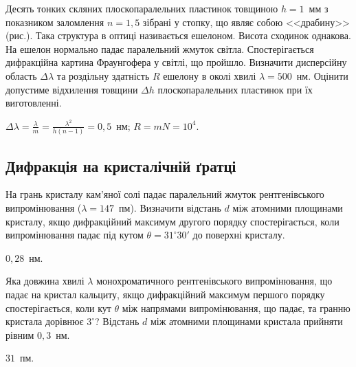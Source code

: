 \begin{problem}%
    Десять тонких скляних плоскопаралельних пластинок товщиною $ h = 1 $~мм з показником заломлення $ n = 1,5 $ зібрані у стопку, що являє собою <<драбину>> (рис.). Така структура в оптиці називається ешелоном. Висота сходинок однакова. На ешелон нормально падає паралельний жмуток світла. Спостерігається дифракційна картина Фраунгофера у світлі, що пройшло. Визначити дисперсійну область $ \Delta\lambda $ та роздільну здатність $ R $ ешелону в околі хвилі $ \lambda = 500 $~нм. Оцінити допустиме відхилення товщини $ \Delta h $  плоскопаралельних пластинок при їх виготовленні.

    \begin{center}
        
    \end{center}
    \begin{solution}
        $\Delta\lambda = \frac{\lambda}{m} = \frac{\lambda^2}{h(n-1)} = 0,5$~нм; $R = mN = 10^4$.
    \end{solution}
\end{problem}




\subsection*{Дифракція на кристалічній ґратці}


\begin{problem}%
    На грань кристалу кам'яної солі падає паралельний жмуток рентгенівського випромінювання ($ \lambda = 147 $~пм). Визначити відстань $ d $ між атомними площинами кристалу, якщо дифракційний максимум другого порядку спостерігається, коли випромінювання падає під кутом $ \theta = 31^\circ30' $ до поверхні кристалу.
    \begin{solution}
        $0,28$~нм.
    \end{solution}
\end{problem}


\begin{problem}%
    Яка довжина хвилі $ \lambda $ монохроматичного рентгенівського випромінювання, що падає на кристал кальциту, якщо дифракційний максимум першого порядку спостерігається, коли кут $ \theta $ між напрямами випромінювання, що падає, та гранню кристала дорівнює $ 3^\circ $? Відстань $ d $ між атомними площинами кристала прийняти рівним $ 0,3 $~нм.
    \begin{solution}
        $31$~пм.
    \end{solution}
\end{problem}


